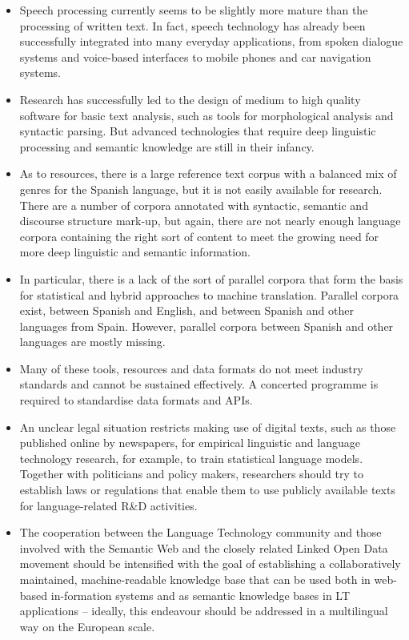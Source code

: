 \begin{multicols}{2}
\begin{itemize}
\item	Speech processing currently seems to be slightly more mature than the processing of written text. In fact, speech technology has already been successfully integrated into many everyday applications, from spoken dialogue systems and voice-based interfaces to mobile phones and car navigation systems.
\item	Research has successfully led to the design of medium to high quality software for basic text analysis, such as tools for morphological analysis and syntactic parsing. But advanced technologies that require deep linguistic processing and semantic knowledge are still in their infancy.
\item	As to resources, there is a large reference text corpus with a balanced mix of genres for the Spanish language, but it is not easily available for research. There are a number of corpora annotated with syntactic, semantic and discourse structure mark-up, but again, there are not nearly enough language corpora containing the right sort of content to meet the growing need for more deep linguistic and semantic information.
\item	In particular, there is a lack of the sort of parallel corpora that form the basis for statistical and hybrid approaches to machine translation. Parallel corpora exist, between Spanish and English, and between Spanish and other languages from Spain. However, parallel corpora between Spanish and other languages are mostly missing.
\item	Many of these tools, resources and data formats do not meet industry standards and cannot be sustained effectively. A concerted programme is required to standardise data formats and APIs.
\item	An unclear legal situation restricts making use of digital texts, such as those published online by newspapers, for empirical linguistic and language technology research, for example, to train statistical language models. Together with politicians and policy makers, researchers should try to establish laws or regulations that enable them to use publicly available texts for language-related R\&D activities.
\item	The cooperation between the Language Technology community and those involved with the Semantic Web and the closely related Linked Open Data movement should be intensified with the goal of establishing a collaboratively maintained, machine-readable knowledge base that can be used both in web-based in-formation systems and as semantic knowledge bases in LT applications -- ideally, this endeavour should be addressed in a multilingual way on the European scale. 
\end{itemize}


\end{multicols}
